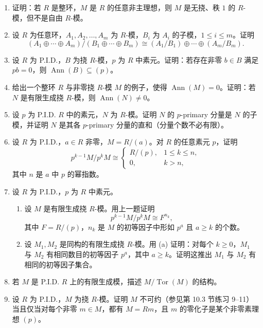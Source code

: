 \begin{enumerate}[label=\arabic*.]
\item 证明：若 $R$ 是整环，$M$ 是 $R$ 的任意非主理想，则 $M$ 是无挠、秩 $1$ 的 $R$-模，但不是自由 $R$-模。

\item 设 $R$ 为任意环，$A_1,A_2,\ldots,A_m$ 为 $R$-模，$B_i$ 为 $A_i$ 的子模，$1\leq i\leq m$。证明
\[
(A_1\oplus\cdots\oplus A_m)/(B_1\oplus\cdots\oplus B_m)
\cong (A_1/B_1)\oplus\cdots\oplus(A_m/B_m).
\]

\item 设 $R$ 为 P.I.D.，$B$ 为挠 $R$-模，$p$ 为 $R$ 中素元。证明：若存在非零 $b\in B$ 满足 $pb=0$，则 $\operatorname{Ann}(B)\subseteq (p)$。

\item 给出一个整环 $R$ 与非零挠 $R$-模 $M$ 的例子，使得 $\operatorname{Ann}(M)=0$。证明：若 $N$ 是有限生成挠 $R$-模，则 $\operatorname{Ann}(N)\ne0$。

\item 设 $p$ 为 P.I.D. $R$ 中的素元，$N$ 为 $R$-模。证明 $N$ 的 $p$-primary 分量是 $N$ 的子模，并证明 $N$ 是其各 $p$-primary 分量的直和（分量个数不必有限）。

\item 设 $R$ 为 P.I.D.，$a\in R$ 非零，$M=R/(a)$。对 $R$ 的任意素元 $p$，证明
\[
p^{k-1}M/p^kM\cong
\begin{cases}
R/(p),& 1\leq k\leq n,\\
0,& k>n,
\end{cases}
\]
其中 $n$ 是 $a$ 中 $p$ 的幂指数。

\item 设 $R$ 为 P.I.D.，$p$ 为 $R$ 中素元。
\begin{enumerate}[label=(\alph*)]
\item 设 $M$ 是有限生成挠 $R$-模。用上一题证明
\[
p^{k-1}M/p^kM\cong F^{n_k},
\]
其中 $F=R/(p)$，$n_k$ 是 $M$ 的初等因子中形如 $p^a$ 且 $a\geq k$ 的个数。
\item 设 $M_1,M_2$ 是同构的有限生成挠 $R$-模。用 (a) 证明：对每个 $k\geq0$，$M_1$ 与 $M_2$ 有相同数目的初等因子 $p^a$，其中 $a\geq k$。证明这推出 $M_1$ 与 $M_2$ 有相同的初等因子集合。
\end{enumerate}

\item 若 $M$ 是 P.I.D. $R$ 上的有限生成模，描述 $M/\operatorname{Tor}(M)$ 的结构。

\item 设 $R$ 为 P.I.D.，$M$ 为挠 $R$-模。证明 $M$ 不可约（参见第 10.3 节练习 9--11）当且仅当对每个非零 $m\in M$，都有 $M=Rm$，且 $m$ 的零化子是某个非零素理想 $(p)$。


\end{enumerate}
